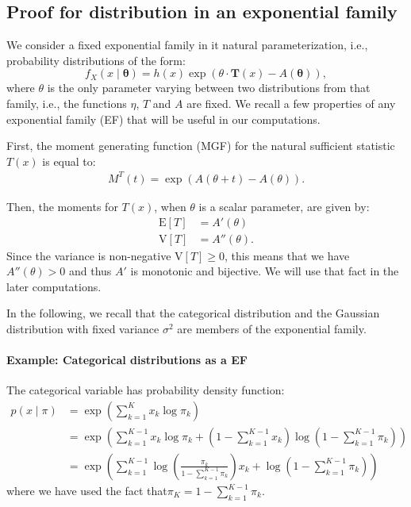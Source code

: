 \subsection{Proof for distribution in an exponential family}
\label{sec:exp_family_proof}


We consider a fixed exponential family in it natural parameterization, i.e., probability distributions of the form:
\begin{equation}
    f_X(x \mid \boldsymbol{\theta})=h(x) \exp (\theta \cdot \mathbf{T}(x)-A(\boldsymbol{\theta})),
\end{equation}
where $\theta$ is the only parameter varying between two distributions from that family, i.e., the functions $\eta$, $T$ and $A$ are fixed. We recall a few properties of any exponential family (EF) that will be useful in our computations.

First, the moment generating function (MGF) for the natural sufficient statistic $T(x)$ is equal to:
\begin{align*}
    M^T(t) = \exp\left(A(\theta+t)-A(\theta)\right).
\end{align*}

Then, the moments for $T(x)$, when $\theta$ is a scalar parameter, are given by:
\begin{align*}
    \mathrm{E}[T] & = A'(\theta)\\
    \mathrm{V}[T] & = A''(\theta).
\end{align*}
Since the variance is non-negative $\mathrm{V}[T] \geq 0$, this means that we have $A''(\theta) > 0$ and thus $A'$ is monotonic and bijective. We will use that fact in the later computations.

In the following, we recall that the categorical distribution and the Gaussian distribution with fixed variance $\sigma^2$ are members of the exponential family.


\paragraph{Example: Categorical distributions as a EF} The categorical variable has probability density function:
\begin{align*}  
p(x \mid \pi) & =\exp \left(\sum_{k=1}^K x_k \log \pi_k\right) \\
& =\exp \left(\sum_{k=1}^{K-1} x_k \log \pi_k+\left(1-\sum_{k=1}^{K-1} x_k\right) \log \left(1-\sum_{k=1}^{K-1} \pi_k\right)\right) \\
& =\exp \left(\sum_{k=1}^{K-1} \log \left(\frac{\pi_k}{1-\sum_{k=1}^{K-1} \pi_k}\right) x_k+\log \left(1-\sum_{k=1}^{K-1} \pi_k\right)\right)
\end{align*}
where we have used the fact that$\pi_K=1-\sum_{k=1}^{K-1} \pi_k$.


